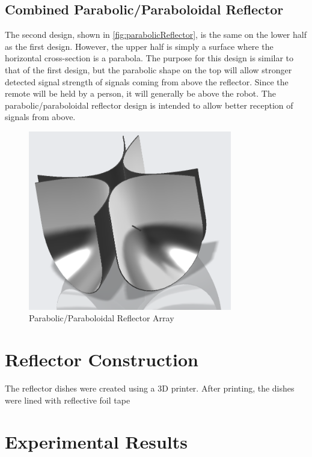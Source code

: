 \subsection{Combined Parabolic/Paraboloidal Reflector}
The second design, shown in \autoref{fig:parabolicReflector}, is the same on the lower half as the first design. However, the upper half is simply a surface where the horizontal cross-section is a parabola. The purpose for this design is similar to that of the first design, but the parabolic shape on the top will allow stronger detected signal strength of signals coming from above the reflector. Since the remote will be held by a person, it will generally be above the robot. The parabolic/paraboloidal reflector design is intended to allow better reception of signals from above.
\begin{figure}
    \centering
    \includegraphics[width=3.5in]{figs/img/parabolicReflector.png}
    \caption{Parabolic/Paraboloidal Reflector Array}
    \label{fig:parabolicReflector}
\end{figure}

\section{Reflector Construction}
The reflector dishes were created using a 3D printer. After printing, the dishes were lined with reflective foil tape


\section{Experimental Results}


